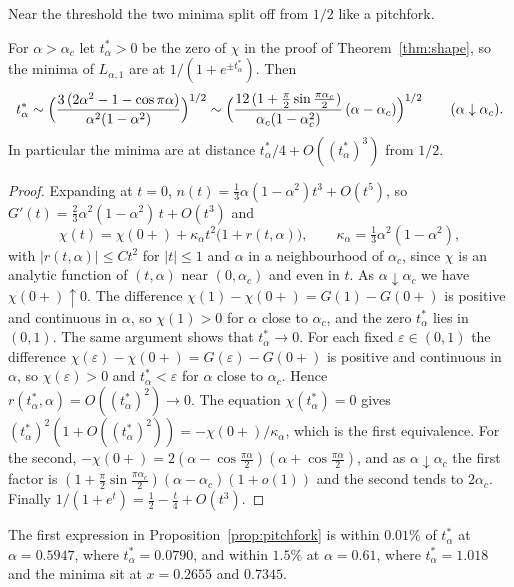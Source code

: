 Near the threshold the two minima split off from $1/2$ like a pitchfork.

\begin{proposition}\label{prop:pitchfork}
For $\alpha>\alpha_c$ let $t^*_\alpha>0$ be the zero of $\chi$ in the proof of
Theorem~\ref{thm:shape}, so the minima of $L_{\alpha,1}$ are at $1/(1+e^{\pm t^*_\alpha})$. Then
\[
 t^*_\alpha\sim\Bigl(\frac{3\,(2\alpha^2-1-\cos\pi\alpha)}{\alpha^2(1-\alpha^2)}\Bigr)^{1/2}
 \sim\Bigl(\frac{12\,(1+\frac\pi2\sin\frac{\pi\alpha_c}2)}{\alpha_c(1-\alpha_c^2)}\,(\alpha-\alpha_c)\Bigr)^{1/2}
 \qquad(\alpha\downarrow\alpha_c).
\]
In particular the minima are at distance $t^*_\alpha/4+O((t^*_\alpha)^3)$ from $1/2$.
\end{proposition}

\begin{proof}
Expanding at $t=0$, $n(t)=\frac13\alpha(1-\alpha^2)t^3+O(t^5)$, so
$G'(t)=\frac23\alpha^2(1-\alpha^2)\,t+O(t^3)$ and
\[
 \chi(t)=\chi(0+)+\kappa_\alpha t^2\bigl(1+r(t,\alpha)\bigr),\qquad
 \kappa_\alpha=\tfrac13\alpha^2(1-\alpha^2),
\]
with $|r(t,\alpha)|\le Ct^2$ for $|t|\le1$ and $\alpha$ in a neighbourhood of $\alpha_c$, since
$\chi$ is an analytic function of $(t,\alpha)$ near $(0,\alpha_c)$ and even in $t$. As
$\alpha\downarrow\alpha_c$ we have $\chi(0+)\uparrow0$. The difference $\chi(1)-\chi(0+)=G(1)-G(0+)$
is positive and continuous in $\alpha$, so $\chi(1)>0$ for $\alpha$ close to $\alpha_c$, and the zero
$t^*_\alpha$ lies in $(0,1)$. The same argument shows that $t^*_\alpha\to0$. For each fixed
$\varepsilon\in(0,1)$ the difference $\chi(\varepsilon)-\chi(0+)=G(\varepsilon)-G(0+)$ is positive and
continuous in $\alpha$, so $\chi(\varepsilon)>0$ and $t^*_\alpha<\varepsilon$ for $\alpha$ close to
$\alpha_c$. Hence $r(t^*_\alpha,\alpha)=O((t^*_\alpha)^2)\to0$. The equation $\chi(t^*_\alpha)=0$ gives
$(t^*_\alpha)^2(1+O((t^*_\alpha)^2))=-\chi(0+)/\kappa_\alpha$, which is the first equivalence. For the
second, $-\chi(0+)=2(\alpha-\cos\frac{\pi\alpha}2)(\alpha+\cos\frac{\pi\alpha}2)$, and as
$\alpha\downarrow\alpha_c$ the first factor is
$(1+\frac\pi2\sin\frac{\pi\alpha_c}2)(\alpha-\alpha_c)(1+o(1))$ and the second tends to $2\alpha_c$.
Finally $1/(1+e^{t})=\frac12-\frac t4+O(t^3)$.
\end{proof}

The first expression in Proposition~\ref{prop:pitchfork} is within $0.01\%$ of $t^*_\alpha$ at
$\alpha=0.5947$, where $t^*_\alpha=0.0790$, and within $1.5\%$ at $\alpha=0.61$, where
$t^*_\alpha=1.018$ and the minima sit at $x=0.2655$ and $0.7345$.


